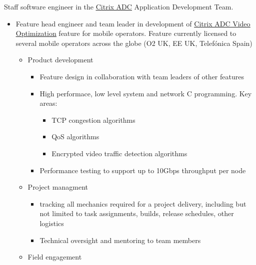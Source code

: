 \documentclass[10pt,a4paper]{moderncv}        %
\newcommand{\fancyhref}[1]{\color{blue}\underline{#1}}
\begin{document}
{Staff software engineer in the \href{https://www.citrix.com/products/citrix-adc/}{\fancyhref{Citrix ADC}} Application Development Team.
\begin{itemize}
  \item Feature head engineer and team leader in development of 
  \href{https://docs.citrix.com/en-us/citrix-adc/current-release/citrix-adc-support-for-telecom-service-providers/citrix-adc-Video-Optimization/getting-started.html}{\fancyhref{Citrix ADC Video Optimization}} feature for mobile operators.
  Feature currently licensed to several mobile operators across the globe (O2 UK, EE UK, Telefónica Spain)
  \begin{itemize}
    \item Product development
    \begin{itemize}
      \item Feature design in collaboration with team leaders of other features
      \item High performace, low level system and network C programming. Key areas:
      \begin{itemize}
        \item TCP congestion algorithms
        \item QoS algorithms
        \item Encrypted video traffic detection algorithms
      \end{itemize}
      \item Performance testing to support up to 10Gbps throughput per node
    \end{itemize}
    \item Project managment
    \begin{itemize}
      \item tracking all mechanics required for a project delivery, including but not limited to task assignments, builds, release schedules, other logistics 
      \item Technical oversight and mentoring to team members
    \end{itemize}
    \item Field engagement

\end{itemize}
\end{itemize}}
\end{document}
